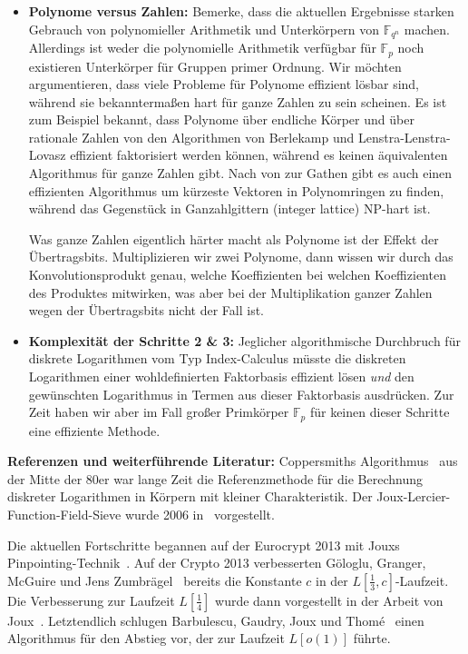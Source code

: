 \begin{refsegment}
\begin{itemize}
\item\textbf{Polynome versus Zahlen:} Bemerke, dass die aktuellen Ergebnisse starken Gebrauch von polynomieller Arithmetik und Unterkörpern von $\mathbb{F}_{q^n}$ machen. Allerdings ist weder die polynomielle Arithmetik verfügbar für $\mathbb{F}_p$ noch existieren Unterkörper für Gruppen primer Ordnung. Wir möchten argumentieren, dass viele Probleme für Polynome effizient lösbar sind, während sie bekanntermaßen hart für ganze Zahlen zu sein scheinen. Es ist zum Beispiel bekannt, dass Polynome über endliche Körper und über rationale Zahlen von den Algorithmen von Berlekamp und Lenstra-Lenstra-Lovasz effizient faktorisiert werden können, während es keinen äquivalenten Algorithmus für ganze Zahlen gibt. Nach von zur Gathen gibt es auch einen effizienten Algorithmus um kürzeste Vektoren in Polynomringen zu finden, während das Gegenstück in Ganzahlgittern (integer lattice) NP-hart ist.

Was ganze Zahlen eigentlich härter macht als Polynome ist der Effekt der Übertragsbits. Multiplizieren wir zwei Polynome, dann wissen wir durch das Konvolutionsprodukt genau, welche Koeffizienten bei welchen Koeffizienten des Produktes mitwirken, was aber bei der Multiplikation ganzer Zahlen wegen der Übertragsbits nicht der Fall ist.

\item\textbf{Komplexität der Schritte 2 \& 3:} Jeglicher algorithmische Durchbruch für diskrete Logarithmen vom Typ Index-Calculus müsste die diskreten Logarithmen einer wohldefinierten Faktorbasis effizient lösen {\em und} den gewünschten Logarithmus in Termen aus dieser Faktorbasis ausdrücken. Zur Zeit haben wir aber im Fall großer Primkörper $\mathbb{F}_p$ für keinen dieser Schritte eine effiziente Methode.
\end{itemize}

\noindent \textbf{Referenzen und weiterführende Literatur:}
Coppersmiths Algorithmus~\cite{Coppersmith1984} aus der Mitte der 80er war lange Zeit die Referenzmethode für die Berechnung diskreter Logarithmen in Körpern mit kleiner Charakteristik. Der Joux-Lercier-Function-Field-Sieve wurde 2006 in~\cite{JL2006} vorgestellt.

Die aktuellen Fortschritte begannen auf der Eurocrypt 2013 mit Jouxs Pinpointing-Tech\-nik~\cite{Pin2013}. Auf der Crypto 2013 verbesserten G\"ologlu, Granger, McGuire und Jens Zumbr\"agel~\cite{GGMZ2013} bereits die Konstante $c$ in der $L[\frac 1 3,c]$-Laufzeit. Die Verbesserung zur Laufzeit $L[\frac 1 4]$ wurde dann vorgestellt in der Arbeit von Joux~\cite{Joux2013}. Letztendlich schlugen Barbulescu, Gaudry, Joux und Thom{\'e}~\cite{BGJT2013} einen Algorithmus für den Abstieg vor, der zur Laufzeit $L[o(1)]$ führte.



\end{refsegment}
